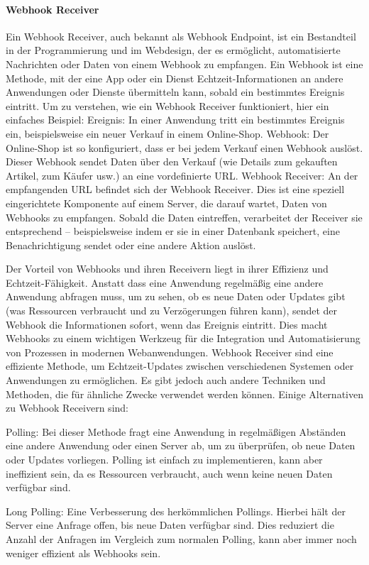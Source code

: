 
\paragraph{Webhook Receiver}
Ein Webhook Receiver, auch bekannt als Webhook Endpoint, ist ein Bestandteil in der Programmierung und im Webdesign, der es ermöglicht, automatisierte Nachrichten oder Daten von einem Webhook zu empfangen. Ein Webhook ist eine Methode, mit der eine App oder ein Dienst Echtzeit-Informationen an andere Anwendungen oder Dienste übermitteln kann, sobald ein bestimmtes Ereignis eintritt.
Um zu verstehen, wie ein Webhook Receiver funktioniert, hier ein einfaches Beispiel:
Ereignis: In einer Anwendung tritt ein bestimmtes Ereignis ein, beispielsweise ein neuer Verkauf in einem Online-Shop.
Webhook: Der Online-Shop ist so konfiguriert, dass er bei jedem Verkauf einen Webhook auslöst. Dieser Webhook sendet Daten über den Verkauf (wie Details zum gekauften Artikel, zum Käufer usw.) an eine vordefinierte URL.
Webhook Receiver: An der empfangenden URL befindet sich der Webhook Receiver. Dies ist eine speziell eingerichtete Komponente auf einem Server, die darauf wartet, Daten von Webhooks zu empfangen. Sobald die Daten eintreffen, verarbeitet der Receiver sie entsprechend – beispielsweise indem er sie in einer Datenbank speichert, eine Benachrichtigung sendet oder eine andere Aktion auslöst.

Der Vorteil von Webhooks und ihren Receivern liegt in ihrer Effizienz und Echtzeit-Fähigkeit. Anstatt dass eine Anwendung regelmäßig eine andere Anwendung abfragen muss, um zu sehen, ob es neue Daten oder Updates gibt (was Ressourcen verbraucht und zu Verzögerungen führen kann), sendet der Webhook die Informationen sofort, wenn das Ereignis eintritt. Dies macht Webhooks zu einem wichtigen Werkzeug für die Integration und Automatisierung von Prozessen in modernen Webanwendungen.
Webhook Receiver sind eine effiziente Methode, um Echtzeit-Updates zwischen verschiedenen Systemen oder Anwendungen zu ermöglichen. Es gibt jedoch auch andere Techniken und Methoden, die für ähnliche Zwecke verwendet werden können. Einige Alternativen zu Webhook Receivern sind:

Polling: Bei dieser Methode fragt eine Anwendung in regelmäßigen Abständen eine andere Anwendung oder einen Server ab, um zu überprüfen, ob neue Daten oder Updates vorliegen. Polling ist einfach zu implementieren, kann aber ineffizient sein, da es Ressourcen verbraucht, auch wenn keine neuen Daten verfügbar sind.

Long Polling: Eine Verbesserung des herkömmlichen Pollings. Hierbei hält der Server eine Anfrage offen, bis neue Daten verfügbar sind. Dies reduziert die Anzahl der Anfragen im Vergleich zum normalen Polling, kann aber immer noch weniger effizient als Webhooks sein.

